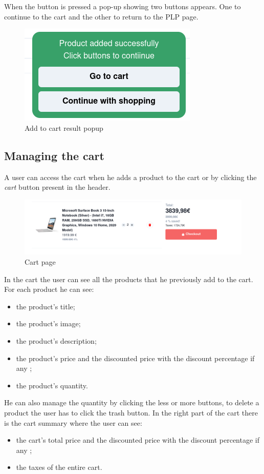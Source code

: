 When the button is pressed a pop-up showing two buttons appears. One to continue to the cart and the other to return to the PLP page.
\begin{figure}[!ht]
    \caption{Add to cart result popup}
    \vspace{10px}
    \includegraphics[scale=0.3]{../../../../Images/userManual/cartResult.png}
    \centering
\end{figure}
\newpage
\subsection{Managing the cart}
A user can access the cart when he adds a product to the cart or by clicking the \textit{cart} button present in the header.
\begin{figure}[!ht]
    \caption{Cart page}
    \vspace{10px}
    \includegraphics[scale=0.3]{../../../../Images/userManual/cart.png}
    \centering
\end{figure}
In the cart the user can see all the products that he previously add to the cart. For each product he can see:
\begin{itemize}
    \item the product's title;
    \item the product's image;
    \item the product's description;
    \item the product's price and the discounted price with the discount percentage if any ;
    \item the product's quantity.
\end{itemize}
He can also manage the quantity by clicking the less or more buttons, to delete a product the user has to click the trash button. In the right part of the cart there is the cart summary where the user can see:
\begin{itemize}
    \item the cart's total price and the discounted price with the discount percentage if any ;
    \item the taxes of the entire cart.
\end{itemize}

